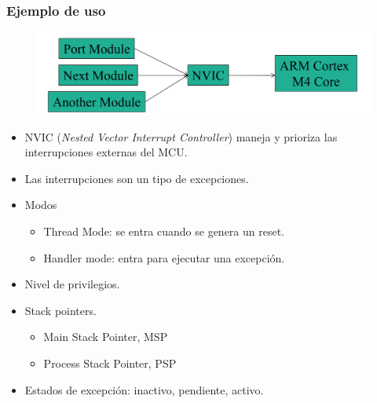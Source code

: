 \documentclass[10.5pt,scale=1.0,t,aspectratio=169,hyperref={pdfpagelabels=false}]{beamer}
\begin{document}
\begin{frame}
	\frametitle{Ejemplo de uso}
	\begin{figure}
		\centering
		\includegraphics[scale=0.35]{04_NVIC}
	\end{figure}
	\begin{itemize}
		\item NVIC (\textit{Nested Vector Interrupt Controller}) maneja y prioriza las interrupciones externas del MCU. 
		\item Las interrupciones son un tipo de excepciones.
		\item Modos
		\begin{itemize}
			\item Thread Mode: se entra cuando se genera un reset.
			\item Handler mode: entra para ejecutar una excepción.
		\end{itemize}
		\item Nivel de privilegios.
		\item Stack pointers.
		\begin{itemize}
			\item Main Stack Pointer, MSP
			\item Process Stack Pointer, PSP
		\end{itemize}
		\item Estados de excepción: inactivo, pendiente, activo.
	\end{itemize}
\end{frame}
\end{document}
